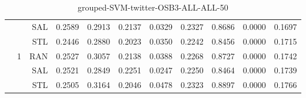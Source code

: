 \begin{center}
\begin{table}[htbp]
\begin{center}
\begin{tabular}{ | r | r | r | r | r | r | r | r | r | r | r |}
 &   & SAL & 0.2589 & 0.2913 & 0.2137 & 0.0329 & 0.2327 & 0.8686 & 0.0000 & 0.1697\\ \cline{3-11}
 &   & STL & 0.2446 & 0.2880 & 0.2023 & 0.0350 & 0.2242 & 0.8456 & 0.0000 & 0.1715\\ \cline{2-11}
 & \multirow{3}{*}{1} & RAN & 0.2527 & 0.3057 & 0.2138 & 0.0388 & 0.2268 & 0.8727 & 0.0000 & 0.1742\\ \cline{3-11}
 &   & SAL & 0.2521 & 0.2849 & 0.2251 & 0.0247 & 0.2250 & 0.8464 & 0.0000 & 0.1739\\ \cline{3-11}
 &   & STL & 0.2505 & 0.3164 & 0.2046 & 0.0478 & 0.2323 & 0.8897 & 0.0000 & 0.1766\\ \cline{2-11}
\hline
\end{tabular}
\caption{grouped-SVM-twitter-OSB3-ALL-ALL-50}
\end{center}
 \end{table}
\end{center}

